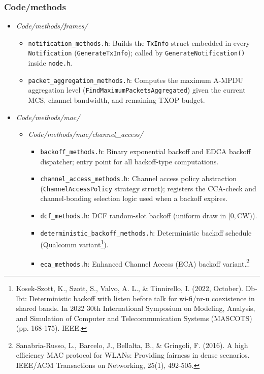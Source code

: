 \documentclass[11pt,a4paper]{article}
\begin{document}
\subsubsection{Code/methods}

\begin{itemize}
    \item \textit{Code/methods/frames/}
    \begin{itemize}
        \item \texttt{notification\_methods.h}: Builds the \texttt{TxInfo} struct embedded in every \texttt{Notification} (\texttt{GenerateTxInfo}); called by \texttt{GenerateNotification()} inside \texttt{node.h}.
        \item \texttt{packet\_aggregation\_methods.h}: Computes the maximum A-MPDU aggregation level (\texttt{FindMaximumPacketsAggregated}) given the current MCS, channel bandwidth, and remaining TXOP budget.
    \end{itemize}
    \item \textit{Code/methods/mac/}
    \begin{itemize}
        \item \textit{Code/methods/mac/channel\_access/}
        \begin{itemize}
            \item \texttt{backoff\_methods.h}: Binary exponential backoff and EDCA backoff dispatcher; entry point for all backoff-type computations.
            \item \texttt{channel\_access\_methods.h}: Channel access policy abstraction (\texttt{ChannelAccessPolicy} strategy struct); registers the CCA-check and channel-bonding selection logic used when a backoff expires.
            \item \texttt{dcf\_methods.h}: DCF random-slot backoff (uniform draw in $[0, \text{CW})$).
            \item \texttt{deterministic\_backoff\_methods.h}: Deterministic backoff schedule (Qualcomm variant\footnote{Kosek-Szott, K., Szott, S., Valvo, A. L., \& Tinnirello, I. (2022, October). Db-lbt: Deterministic backoff with listen before talk for wi-fi/nr-u coexistence in shared bands. In 2022 30th International Symposium on Modeling, Analysis, and Simulation of Computer and Telecommunication Systems (MASCOTS) (pp. 168-175). IEEE.}).
            \item \texttt{eca\_methods.h}: Enhanced Channel Access (ECA) backoff variant.\footnote{Sanabria-Russo, L., Barcelo, J., Bellalta, B., \& Gringoli, F. (2016). A high efficiency MAC protocol for WLANs: Providing fairness in dense scenarios. IEEE/ACM Transactions on Networking, 25(1), 492-505.}

\end{itemize}
\end{itemize}
\end{itemize}
\end{document}
